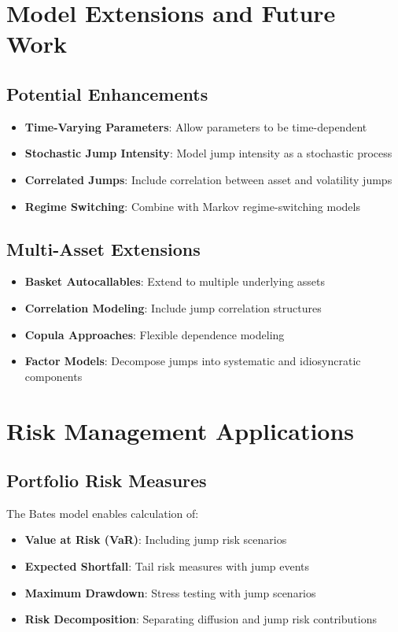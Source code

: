 \documentclass[12pt,a4paper]{article}
\begin{document}
\section{Model Extensions and Future Work}

\subsection{Potential Enhancements}

\begin{itemize}
    \item \textbf{Time-Varying Parameters}: Allow parameters to be time-dependent
    \item \textbf{Stochastic Jump Intensity}: Model jump intensity as a stochastic process
    \item \textbf{Correlated Jumps}: Include correlation between asset and volatility jumps
    \item \textbf{Regime Switching}: Combine with Markov regime-switching models
\end{itemize}

\subsection{Multi-Asset Extensions}

\begin{itemize}
    \item \textbf{Basket Autocallables}: Extend to multiple underlying assets
    \item \textbf{Correlation Modeling}: Include jump correlation structures
    \item \textbf{Copula Approaches}: Flexible dependence modeling
    \item \textbf{Factor Models}: Decompose jumps into systematic and idiosyncratic components
\end{itemize}

\section{Risk Management Applications}

\subsection{Portfolio Risk Measures}

The Bates model enables calculation of:

\begin{itemize}
    \item \textbf{Value at Risk (VaR)}: Including jump risk scenarios
    \item \textbf{Expected Shortfall}: Tail risk measures with jump events
    \item \textbf{Maximum Drawdown}: Stress testing with jump scenarios
    \item \textbf{Risk Decomposition}: Separating diffusion and jump risk contributions
\end{itemize}
\end{document}
